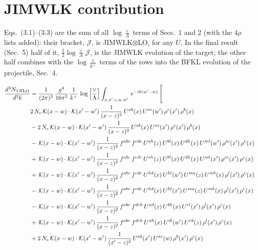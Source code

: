 \documentclass[9pt]{article}
\numberwithin{equation}{section}
\newcommand{\new}[1]{{\color{blue}#1}}
\begin{document}
\section{JIMWLK contribution}
\new{Eqs.~(3.1)--(3.3) are the sum of all $\log\frac{\vee}{\Lambda}$ terms of Secs.~1 and 2 (with the $4\rho$ lists added): their bracket, $\mathcal J$, is JIMWLK$\otimes$LO, for any $U$. In the final result (Sec.~5) half of it, $\frac12\log\frac{\vee}{\Lambda}\,\mathcal J$, is the JIMWLK evolution of the target; the other half combines with the $\log\frac{\vee}{k^+}$ terms of the rows into the BFKL evolution of the projectile, Sec.~4.}

\begin{align}
\frac{d^{3}N_{1\,\mathrm{NLO}}}{d^{3}k} & = \frac{1}{(2\pi)^{3}}\,\frac{g^{4}}{16\pi^{5}}\,\frac{1}{k^{+}}\,\log\Big[\frac{\vee}{\Lambda}\Big]\int_{x,x',z,w,w'}\,e^{-ik(w'-w)}\,\Bigg[\notag\\
&2\,N_{c}\,\mathcal{K}(x-w)\cdot\mathcal{K}(x'-w')\,\frac{1}{(x-z)^{2}}\,U^{ab}(x)\,U^{ac}(w')\,\rho^{c}(x')\,\rho^{b}(x)\notag\\
&-2\,N_{c}\,\mathcal{K}(x-w)\cdot\mathcal{K}(x'-w')\,\frac{1}{(x-z)^{2}}\,U^{ab}(x)\,U^{ac}(x')\,\rho^{c}(x')\,\rho^{b}(x)\notag\\
&-\,\mathcal{K}(x-w)\cdot\mathcal{K}(x'-w')\,\frac{1}{(x-z)^{2}}\,f^{abc}\,f^{cde}\,U^{ah}(z)\,U^{bl}(x)\,U^{dh}(x)\,U^{ml}(w')\,\rho^{m}(x')\,\rho^{e}(x)\notag\\
&+\,\mathcal{K}(x-w)\cdot\mathcal{K}(x'-w')\,\frac{1}{(x-z)^{2}}\,f^{abc}\,f^{cde}\,U^{ah}(z)\,U^{bl}(x)\,U^{dh}(x)\,U^{ml}(x')\,\rho^{m}(x')\,\rho^{e}(x)\notag\\
&+\,\mathcal{K}(x-w)\cdot\mathcal{K}(x'-w')\,\frac{1}{(x-z)^{2}}\,f^{abc}\,f^{cde}\,U^{hd}(x)\,U^{hl}(w')\,U^{ma}(z)\,U^{mb}(x)\,\rho^{l}(x')\,\rho^{e}(x)\notag\\
&-\,\mathcal{K}(x-w)\cdot\mathcal{K}(x'-w')\,\frac{1}{(x-z)^{2}}\,f^{abc}\,f^{cde}\,U^{hd}(x)\,U^{hl}(x')\,U^{ma}(z)\,U^{mb}(x)\,\rho^{l}(x')\,\rho^{e}(x)\notag\\
&-\,\mathcal{K}(x-w)\cdot\mathcal{K}(x'-w')\,\frac{1}{(x-z)^{2}}\,f^{abc}\,f^{deh}\,U^{ad}(z)\,U^{bh}(x)\,U^{el}(x')\,\rho^{l}(x')\,\rho^{c}(x)\notag\\
&+\,\mathcal{K}(x-w)\cdot\mathcal{K}(x'-w')\,\frac{1}{(x-z)^{2}}\,f^{abc}\,f^{deh}\,U^{ah}(x)\,U^{dl}(w')\,U^{eb}(z)\,\rho^{l}(x')\,\rho^{c}(x)\notag\\
&+2\,N_{c}\,\mathcal{K}(x-w)\cdot\mathcal{K}(x'-w')\,\frac{1}{(x'-z)^{2}}\,U^{ab}(x')\,U^{ac}(w)\,\rho^{b}(x')\,\rho^{c}(x)\notag\\

\end{align}
\end{document}
